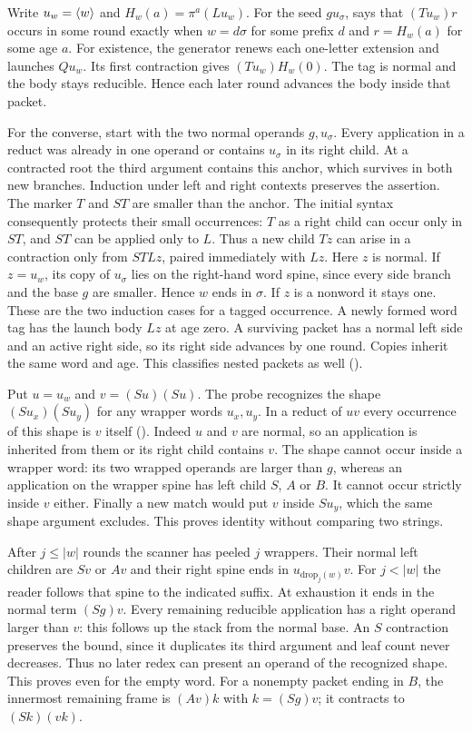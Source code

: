 Write $u_w=\langle w\rangle$ and $H_w(a)=\pi^a(Lu_w)$. For the seed $g u_\sigma$,
 says that $(Tu_w)r$ occurs in some round
exactly when $w=d\sigma$ for some prefix $d$ and $r=H_w(a)$ for some
age $a$. For existence, the generator renews each one-letter extension
and launches $Qu_w$. Its first contraction gives $(Tu_w)H_w(0)$.
The tag is normal and the body stays reducible. Hence each later round
advances the body inside that packet.

For the converse, start with the two normal operands $g,u_\sigma$.
Every application in a reduct was already in one operand or contains
$u_\sigma$ in its right child. At a contracted root the third argument
contains this anchor, which survives in both new branches. Induction
under left and right contexts preserves the assertion. The marker $T$
and $ST$ are smaller than the anchor. The initial syntax consequently
protects their small occurrences: $T$ as a right child can occur only in
$ST$, and $ST$ can be applied only to $L$. Thus a new child $Tz$ can arise
in a contraction only from $STLz$, paired immediately with $Lz$.
Here $z$ is normal. If $z=u_w$, its copy of $u_\sigma$ lies on the
right-hand word spine, since every side branch and the base $g$ are
smaller. Hence $w$ ends in $\sigma$. If $z$ is a nonword it stays one.
These are the two induction cases for a tagged occurrence. A newly
formed word tag has the launch body $Lz$ at age zero. A surviving
packet has a normal left side and an active right side, so its right
side advances by one round. Copies inherit the same word and age.
This classifies nested packets as well ().

Put $u=u_w$ and $v=(Su)(Su)$. The probe recognizes the shape
$(Su_x)(Su_y)$ for any wrapper words $u_x,u_y$. In a reduct of $uv$
every occurrence of this shape is $v$ itself
(). Indeed $u$ and $v$ are normal, so an
application is inherited from them or its right child contains $v$.
The shape cannot occur inside a wrapper word: its two wrapped operands
are larger than $g$, whereas an application on the wrapper spine has
left child $S$, $A$ or $B$. It cannot occur strictly inside $v$ either.
Finally a new match would put $v$ inside $Su_y$, which the same shape
argument excludes. This proves identity without comparing two strings.

After $j\le |w|$ rounds the scanner has peeled $j$ wrappers. Their
normal left children are $Sv$ or $Av$ and their right spine ends in
$u_{\mathrm{drop}_j(w)}v$. For $j<|w|$ the reader follows that spine to
the indicated suffix. At exhaustion it ends in the normal term $(Sg)v$.
Every remaining reducible application has a right operand larger than
$v$: this follows up the stack from the normal base. An $S$ contraction
preserves the bound, since it duplicates its third argument and leaf
count never decreases. Thus no later redex can present an operand of the
recognized shape. This proves  even for the
empty word. For a nonempty packet ending in $B$, the innermost remaining
frame is $(Av)k$ with $k=(Sg)v$; it contracts to $(Sk)(vk)$.

